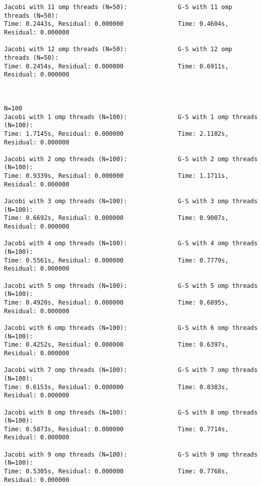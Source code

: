 \documentclass{article}
\begin{document}
\begin{lstlisting}
Jacobi with 11 omp threads (N=50):              G-S with 11 omp threads (N=50):
Time: 0.2443s, Residual: 0.000000               Time: 0.4604s, Residual: 0.000000
                        
Jacobi with 12 omp threads (N=50):              G-S with 12 omp threads (N=50):
Time: 0.2454s, Residual: 0.000000               Time: 0.6911s, Residual: 0.000000
                        
                        
                        
N=100                        
Jacobi with 1 omp threads (N=100):              G-S with 1 omp threads (N=100):
Time: 1.7145s, Residual: 0.000000               Time: 2.1102s, Residual: 0.000000
                        
Jacobi with 2 omp threads (N=100):              G-S with 2 omp threads (N=100):
Time: 0.9339s, Residual: 0.000000               Time: 1.1711s, Residual: 0.000000
                        
Jacobi with 3 omp threads (N=100):              G-S with 3 omp threads (N=100):
Time: 0.6692s, Residual: 0.000000               Time: 0.9007s, Residual: 0.000000
                        
Jacobi with 4 omp threads (N=100):              G-S with 4 omp threads (N=100):
Time: 0.5561s, Residual: 0.000000               Time: 0.7779s, Residual: 0.000000
                        
Jacobi with 5 omp threads (N=100):              G-S with 5 omp threads (N=100):
Time: 0.4920s, Residual: 0.000000               Time: 0.6895s, Residual: 0.000000
                        
Jacobi with 6 omp threads (N=100):              G-S with 6 omp threads (N=100):
Time: 0.4252s, Residual: 0.000000               Time: 0.6397s, Residual: 0.000000
                        
Jacobi with 7 omp threads (N=100):              G-S with 7 omp threads (N=100):
Time: 0.6153s, Residual: 0.000000               Time: 0.8383s, Residual: 0.000000
                        
Jacobi with 8 omp threads (N=100):              G-S with 8 omp threads (N=100):
Time: 0.5873s, Residual: 0.000000               Time: 0.7714s, Residual: 0.000000
                        
Jacobi with 9 omp threads (N=100):              G-S with 9 omp threads (N=100):
Time: 0.5305s, Residual: 0.000000               Time: 0.7768s, Residual: 0.000000
                        

\end{lstlisting}
\end{document}
